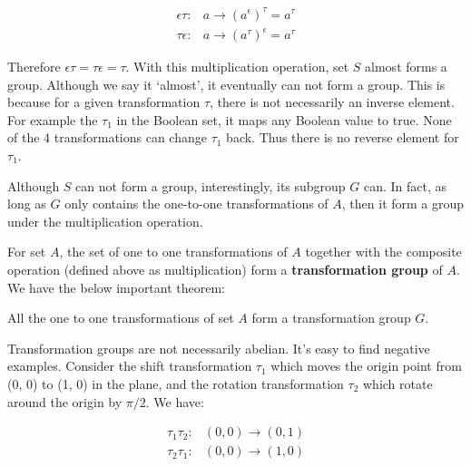 \documentclass[b5paper]{article}
\begin{document}
\[
\begin{array}{rl}
\epsilon\tau: & a \to (a^\epsilon)^\tau = a^\tau \\
\tau\epsilon: & a \to (a^\tau)^\epsilon = a^\tau
\end{array}
\]

Therefore $\epsilon\tau = \tau\epsilon = \tau$. With this multiplication operation, set $S$ almost forms a group. Although we say it `almost', it eventually can not form a group. This is because for a given transformation $\tau$, there is not necessarily an inverse element. For example the $\tau_1$ in the Boolean set, it maps any Boolean value to true. None of the 4 transformations can change $\tau_1$ back. Thus there is no reverse element for $\tau_1$.

Although $S$ can not form a group, interestingly, its subgroup $G$ can. In fact, as long as $G$ only contains the one-to-one transformations of $A$, then it form a group under the multiplication operation.


For set $A$, the set of one to one transformations of $A$ together with the composite operation (defined above as multiplication) form a \textbf{transformation group} of $A$. We have the below important theorem:

\begin{theorem}
All the one to one transformations of set $A$ form a transformation group $G$.
\end{theorem}

Transformation groups are not necessarily abelian. It's easy to find negative examples. Consider the shift transformation $\tau_1$ which moves the origin point from (0, 0) to (1, 0) in the plane, and the rotation transformation $\tau_2$ which rotate around the origin by $\pi/2$. We have:

\[
\begin{array}{rl}
\tau_1\tau_2: & (0, 0) \to (0, 1) \\
\tau_2\tau_1: & (0, 0) \to (1, 0)
\end{array}
\]
\end{document}
